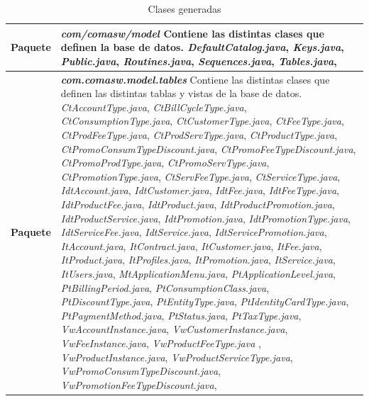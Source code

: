 \begin{longtable}{m{3cm} m{12cm}}
    \caption{Clases generadas}
    \label{tab:generados}\\  	
    \rowcolors{2}{white}{white}
\textbf{Paquete} & \textit{\textbf{com/comasw/model}} \newline
	Contiene las distintas clases que definen la base de datos.\newline    
\textit{DefaultCatalog.java}, 
\textit{Keys.java}, 
\textit{Public.java}, 
\textit{Routines.java}, 
\textit{Sequences.java}, 
\textit{Tables.java},
\\\hline

	\textbf{Paquete} & \textit{\textbf{com.comasw.model.tables}} \newline
	Contiene las distintas clases que definen las distintas tablas y vistas de la base de datos.\newline
\textit{CtAccountType.java}, 
\textit{CtBillCycleType.java}, 
\textit{CtConsumptionType.java}, 
\textit{CtCustomerType.java}, 
\textit{CtFeeType.java}, 
\textit{CtProdFeeType.java}, 
\textit{CtProdServType.java}, 
\textit{CtProductType.java}, 
\textit{CtPromoConsumTypeDiscount.java}, 
\textit{CtPromoFeeTypeDiscount.java}, 
\textit{CtPromoProdType.java}, 
\textit{CtPromoServType.java}, 
\textit{CtPromotionType.java}, 
\textit{CtServFeeType.java}, 
\textit{CtServiceType.java}, 
\textit{IdtAccount.java}, 
\textit{IdtCustomer.java}, 
\textit{IdtFee.java}, 
\textit{IdtFeeType.java}, 
\textit{IdtProductFee.java}, 
\textit{IdtProduct.java}, 
\textit{IdtProductPromotion.java}, 
\textit{IdtProductService.java}, 
\textit{IdtPromotion.java}, 
\textit{IdtPromotionType.java}, 
\textit{IdtServiceFee.java}, 
\textit{IdtService.java}, 
\textit{IdtServicePromotion.java}, 
\textit{ItAccount.java}, 
\textit{ItContract.java}, 
\textit{ItCustomer.java}, 
\textit{ItFee.java}, 
\textit{ItProduct.java}, 
\textit{ItProfiles.java}, 
\textit{ItPromotion.java}, 
\textit{ItService.java}, 
\textit{ItUsers.java}, 
\textit{MtApplicationMenu.java}, 
\textit{PtApplicationLevel.java}, 
\textit{PtBillingPeriod.java}, 
\textit{PtConsumptionClass.java}, 
\textit{PtDiscountType.java}, 
\textit{PtEntityType.java}, 
\textit{PtIdentityCardType.java}, 
\textit{PtPaymentMethod.java}, 
\textit{PtStatus.java}, 
\textit{PtTaxType.java}, 
\textit{VwAccountInstance.java}, 
\textit{VwCustomerInstance.java}, 
\textit{VwFeeInstance.java}, 
\textit{VwProductFeeType.java} ,
\textit{VwProductInstance.java}, 
\textit{VwProductServiceType.java}, 
\textit{VwPromoConsumTypeDiscount.java}, 
\textit{VwPromotionFeeTypeDiscount.java}, 

\end{longtable}
